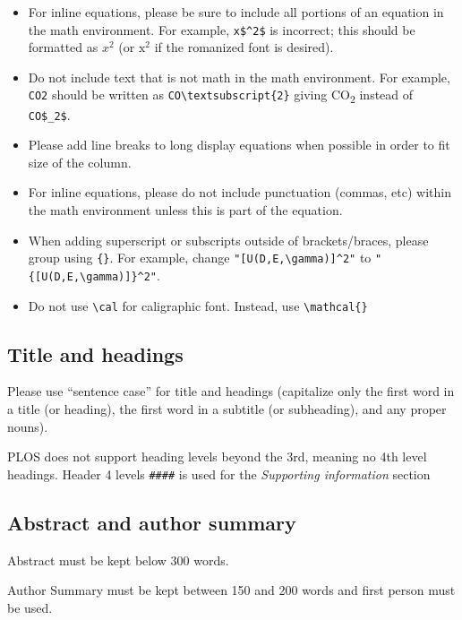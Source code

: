 \documentclass[
  10pt,
  letterpaper,
]{article}
\begin{document}
\begin{itemize}
\item
  For inline equations, please be sure to include all portions of an
  equation in the math environment. For example, \texttt{x\$\^{}2\$} is
  incorrect; this should be formatted as \(x^2\) (or \(\mathrm{x}^2\) if
  the romanized font is desired).
\item
  Do not include text that is not math in the math environment. For
  example, \texttt{CO2} should be written as
  \texttt{CO\textbackslash{}textsubscript\{2\}} giving
  CO\textsubscript{2} instead of \texttt{CO\$\_2\$}.
\item
  Please add line breaks to long display equations when possible in
  order to fit size of the column.
\item
  For inline equations, please do not include punctuation (commas, etc)
  within the math environment unless this is part of the equation.
\item
  When adding superscript or subscripts outside of brackets/braces,
  please group using \texttt{\{\}}. For example, change
  \texttt{"{[}U(D,E,\textbackslash{}gamma){]}\^{}2"} to
  \texttt{"\{{[}U(D,E,\textbackslash{}gamma){]}\}\^{}2"}.\\
\item
  Do not use \texttt{\textbackslash{}cal} for caligraphic font. Instead,
  use \texttt{\textbackslash{}mathcal\{\}}
\end{itemize}

\subsection{Title and headings}\label{title-and-headings}

Please use ``sentence case'' for title and headings (capitalize only the
first word in a title (or heading), the first word in a subtitle (or
subheading), and any proper nouns).

PLOS does not support heading levels beyond the 3rd, meaning no 4th
level headings. Header 4 levels \texttt{\#\#\#\#} is used for the
\emph{Supporting information} section

\subsection{Abstract and author
summary}\label{abstract-and-author-summary}

Abstract must be kept below 300 words.

Author Summary must be kept between 150 and 200 words and first person
must be used.
\end{document}
